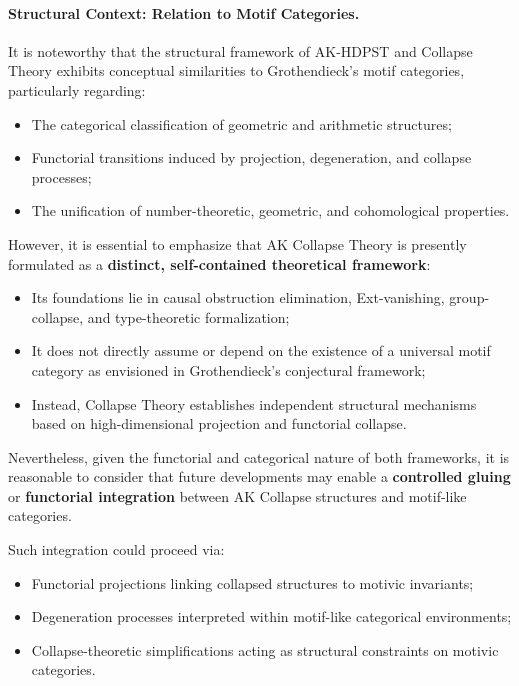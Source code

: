 \documentclass[11pt]{article}
\begin{document}
\paragraph{Structural Context: Relation to Motif Categories.}

It is noteworthy that the structural framework of AK-HDPST and Collapse Theory exhibits conceptual similarities to Grothendieck's motif categories, particularly regarding:

\begin{itemize}
    \item The categorical classification of geometric and arithmetic structures;
    \item Functorial transitions induced by projection, degeneration, and collapse processes;
    \item The unification of number-theoretic, geometric, and cohomological properties.
\end{itemize}

However, it is essential to emphasize that AK Collapse Theory is presently formulated as a \textbf{distinct, self-contained theoretical framework}:

\begin{itemize}
    \item Its foundations lie in causal obstruction elimination, Ext-vanishing, group-collapse, and type-theoretic formalization;
    \item It does not directly assume or depend on the existence of a universal motif category as envisioned in Grothendieck's conjectural framework;
    \item Instead, Collapse Theory establishes independent structural mechanisms based on high-dimensional projection and functorial collapse.
\end{itemize}

Nevertheless, given the functorial and categorical nature of both frameworks, it is reasonable to consider that future developments may enable a \textbf{controlled gluing} or \textbf{functorial integration} between AK Collapse structures and motif-like categories.

Such integration could proceed via:

\begin{itemize}
    \item Functorial projections linking collapsed structures to motivic invariants;
    \item Degeneration processes interpreted within motif-like categorical environments;
    \item Collapse-theoretic simplifications acting as structural constraints on motivic categories.
\end{itemize}
\end{document}
